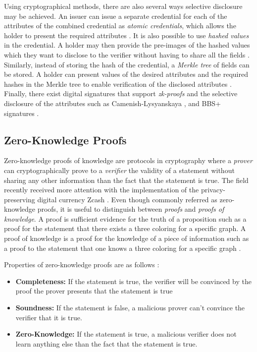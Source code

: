 Using cryptographical methods, there are also several ways selective disclosure may be achieved. An issuer can issue a separate credential for each of the attributes of the combined credential as \textit{atomic credentials}, which allows the holder to present the required attributes \parencite{Chadwick.2019}. It is also possible to use \textit{hashed values} in the credential. A holder may then provide the pre-images of the hashed values which they want to disclose to the verifier without having to share all the fields \parencite[961]{R.Mukta.2020}. Similarly, instead of storing the hash of the credential, a \textit{Merkle tree} of fields can be stored. A holder can present values of the desired attributes and the required hashes in the Merkle tree to enable verification of the disclosed attributes \parencite{Hitchens.9Eyl2018}. Finally, there exist digital signatures that support \textit{\acrfull{zk-proofs}} and the selective disclosure of the attributes such as Camenish-Lysyanskaya \parencite{camenisch2002signature}, and BBS+ signatures \parencite{boneh2004short, camenisch2016anonymous, lodder_looker_2020}.


\subsection{Zero-Knowledge Proofs}

Zero-knowledge proofs of knowledge are protocols in cryptography where a \textit{prover} can cryptographically prove to a \textit{verifier} the validity of a statement without sharing any other information than the fact that the statement is true. The field recently received more attention with the implementation of the privacy-preserving digital currency Zcash \parencite{E.BenSasson.2016}. Even though commonly referred as zero-knowledge proofs, it is useful to distinguish between \textit{proofs} and \textit{proofs of knowledge}. A proof is sufficient evidence for the truth of a proposition such as a proof for the statement that there exists a three coloring for a specific graph. A proof of knowledge is a proof for the knowledge of a piece of information such as a proof to the statement that one knows a three coloring for a specific graph \parencite{green_2017}. 

Properties of zero-knowledge proofs are as follows \parencite{Groth.2010}:
\begin{itemize}
  \item \textbf{Completeness:} If the statement is true, the verifier will be convinced by the proof the prover presents that the statement is true
  \item \textbf{Soundness:} If the statement is false, a malicious prover can't convince the verifier that it is true.
  \item \textbf{Zero-Knowledge:} If the statement is true, a malicious verifier does not learn anything else than the fact that the statement is true.
\end{itemize}

